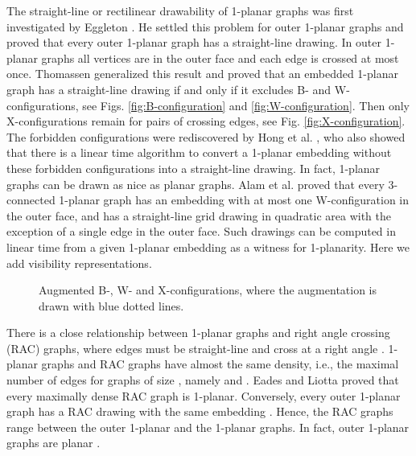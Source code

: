 \documentclass[runningheads]{llncs}
\begin{document}
The straight-line or rectilinear drawability of 1-planar graphs was
first investigated by Eggleton \cite{e-rdg-86}. He settled this
problem for outer 1-planar graphs and proved that every outer
1-planar graph has a straight-line drawing. In outer 1-planar graphs
all vertices are in the outer face and each edge is crossed at most
once. Thomassen \cite{t-rdg-88} generalized this result and proved
that an embedded 1-planar graph has a straight-line  drawing if and
only if it excludes B- and W-configurations, see Figs.
\ref{fig:B-configuration} and \ref{fig:W-configuration}. Then only
X-configurations remain for pairs of crossing edges, see Fig.
\ref{fig:X-configuration}. The forbidden configurations were
rediscovered by Hong et al. \cite{help-ft1pg-12}, who also showed
that there is a linear time algorithm to convert a 1-planar
embedding without these forbidden configurations into a
straight-line drawing. In fact, 1-planar graphs can be drawn as nice
as planar graphs. Alam et al. \cite{abk-sld3c-13} proved that every
3-connected 1-planar graph has an embedding with at most one
W-configuration in the outer face, and has a straight-line grid
drawing in quadratic area with the exception of a single edge in the
outer face. Such  drawings can be computed in linear time from a
given 1-planar embedding as a witness for 1-planarity. Here we add
visibility representations.

\begin{figure}
  \centering
  \hfil
\hfil
  \caption{Augmented B-, W- and X-configurations, where the augmentation
  is drawn with blue dotted lines.
  \label{fig:BWXconfig}}
\end{figure}

There is a close relationship  between  1-planar graphs and right
angle crossing (RAC) graphs, where edges must be straight-line and
cross at a right angle \cite{del-dgrac-11}. 1-planar graphs and RAC
graphs have almost the same density, i.e., the maximal number of
edges for graphs of size , namely  and . Eades and
Liotta \cite{el-racg1p-13} proved that every maximally dense RAC
graph is 1-planar. Conversely, every outer 1-planar graph has a RAC
drawing with the same embedding \cite{de-eogracd-12}. Hence, the RAC
graphs range between the outer 1-planar and the 1-planar graphs. In
fact,
outer 1-planar graphs are planar \cite{abbghnr-ro1pglt-13}.\\
\end{document}
